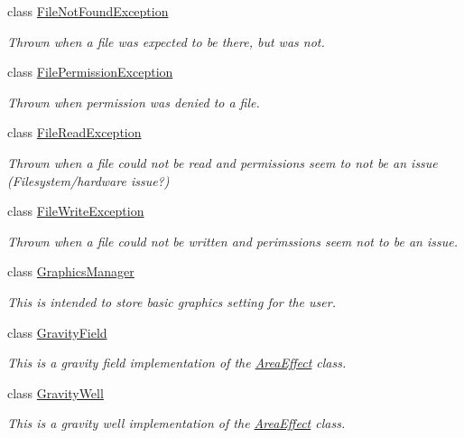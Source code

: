 \begin{DoxyCompactItemize}
class \hyperlink{classMezzanine_1_1FileNotFoundException}{File\-Not\-Found\-Exception}
\begin{DoxyCompactList}\small\item\em Thrown when a file was expected to be there, but was not. \end{DoxyCompactList}\item 
class \hyperlink{classMezzanine_1_1FilePermissionException}{File\-Permission\-Exception}
\begin{DoxyCompactList}\small\item\em Thrown when permission was denied to a file. \end{DoxyCompactList}\item 
class \hyperlink{classMezzanine_1_1FileReadException}{File\-Read\-Exception}
\begin{DoxyCompactList}\small\item\em Thrown when a file could not be read and permissions seem to not be an issue (Filesystem/hardware issue?) \end{DoxyCompactList}\item 
class \hyperlink{classMezzanine_1_1FileWriteException}{File\-Write\-Exception}
\begin{DoxyCompactList}\small\item\em Thrown when a file could not be written and perimssions seem not to be an issue. \end{DoxyCompactList}\item 
class \hyperlink{classMezzanine_1_1GraphicsManager}{Graphics\-Manager}
\begin{DoxyCompactList}\small\item\em This is intended to store basic graphics setting for the user. \end{DoxyCompactList}\item 
class \hyperlink{classMezzanine_1_1GravityField}{Gravity\-Field}
\begin{DoxyCompactList}\small\item\em This is a gravity field implementation of the \hyperlink{classMezzanine_1_1AreaEffect}{Area\-Effect} class. \end{DoxyCompactList}\item 
class \hyperlink{classMezzanine_1_1GravityWell}{Gravity\-Well}
\begin{DoxyCompactList}\small\item\em This is a gravity well implementation of the \hyperlink{classMezzanine_1_1AreaEffect}{Area\-Effect} class. \end{DoxyCompactList}\item 

\end{DoxyCompactItemize}
